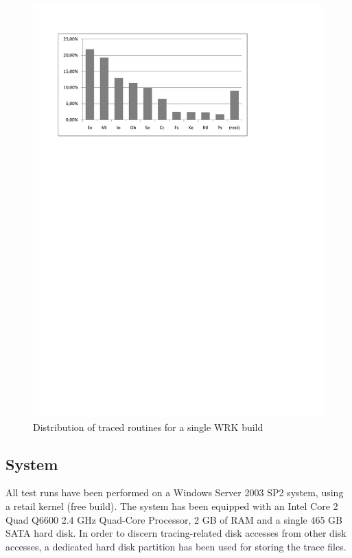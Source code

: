 \begin{figure}[htbp] 
\begin{centering} 
\includegraphics[scale=0.75, clip=true, viewport=1.8cm 20cm 17cm 28cm]{images/diagrams/HistogramSingleBuild.pdf} 
\caption{Distribution of traced routines for a single WRK build} 
\label{HistogramSingleBuild} 
\end{centering} 
\end{figure}


\subsection{System}
All test runs have been performed on a Windows Server 2003 SP2 system, using a retail
kernel (free build). The system has been equipped with an Intel Core 2 Quad Q6600 2.4 GHz 
Quad-Core Processor, 2 GB of RAM and a single 465 GB SATA hard disk. 
In order to discern tracing-related disk accesses 
from other disk accesses, a dedicated hard disk partition has been used for storing the trace 
files. 

